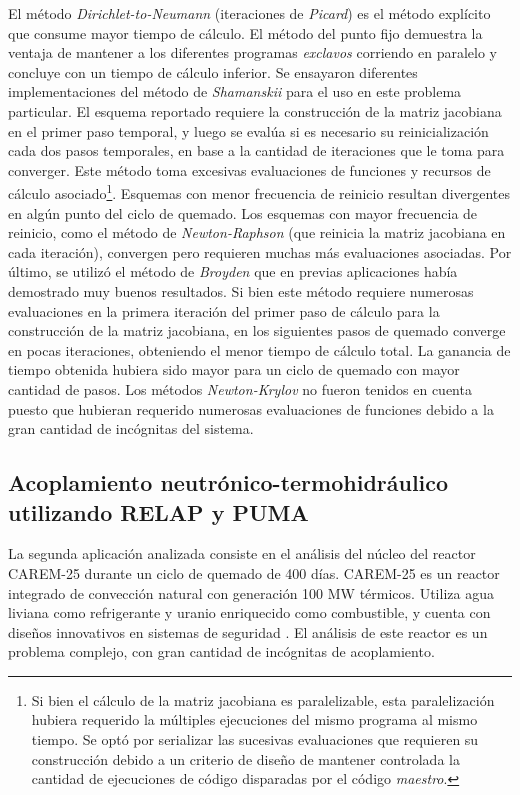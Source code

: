 El método \textit{Dirichlet-to-Neumann} (iteraciones de \textit{Picard}) es el método explícito que consume mayor tiempo de cálculo.
El método del punto fijo demuestra la ventaja de mantener a los diferentes programas \textit{exclavos} corriendo en paralelo y concluye con un tiempo de cálculo inferior.
Se ensayaron diferentes implementaciones del método de \textit{Shamanskii} para el uso en este problema particular.
El esquema reportado requiere la construcción de la matriz jacobiana en el primer paso temporal,
y luego se evalúa si es necesario su reinicialización cada dos pasos temporales,
en base a la cantidad de iteraciones que le toma para converger.
Este método toma excesivas evaluaciones de funciones y recursos de cálculo asociado\footnote{
Si bien el cálculo de la matriz jacobiana es paralelizable,
esta paralelización hubiera requerido la múltiples ejecuciones del mismo programa al mismo tiempo.
Se optó por serializar las sucesivas evaluaciones que requieren su construcción debido a un criterio de diseño
de mantener controlada la cantidad de ejecuciones de código disparadas por el código \textit{maestro}.
}.
Esquemas con menor frecuencia de reinicio resultan divergentes en algún punto del ciclo de quemado.
Los esquemas con mayor frecuencia de reinicio, como el método de \textit{Newton-Raphson} (que reinicia la matriz jacobiana en cada iteración),
convergen pero requieren muchas más evaluaciones asociadas.
Por último, se utilizó el método de \textit{Broyden} que en previas aplicaciones había demostrado muy buenos resultados.
Si bien este método requiere numerosas evaluaciones en la primera iteración del primer paso de cálculo para la construcción de la matriz jacobiana,
en los siguientes pasos de quemado converge en pocas iteraciones, obteniendo el menor tiempo de cálculo total.
La ganancia de tiempo obtenida hubiera sido mayor para un ciclo de quemado con mayor cantidad de pasos.
Los métodos \textit{Newton-Krylov} no fueron tenidos en cuenta puesto que hubieran requerido numerosas evaluaciones de funciones
debido a la gran cantidad de incógnitas del sistema.

\subsection*{Acoplamiento neutrónico-termohidráulico utilizando RELAP y PUMA}
\label{3:relap-puma}

La segunda aplicación analizada consiste en el análisis del núcleo del reactor CAREM-25 \cite{carem} durante un ciclo de quemado de 400 días.
CAREM-25 es un reactor integrado de convección natural con generación 100 MW térmicos.
Utiliza agua liviana como refrigerante y uranio enriquecido como combustible, y
cuenta con diseños innovativos en sistemas de seguridad \cite{carem}.
El análisis de este reactor es un problema complejo, con gran cantidad de incógnitas de acoplamiento.

